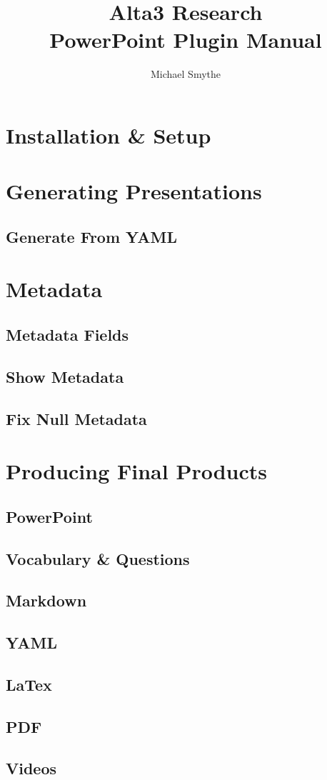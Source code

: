 \documentclass[12pt,a4paper,openany]{book}
\author{Michael Smythe}
\title{\textbf{Alta3 Research} \\ \small{PowerPoint Plugin Manual}}
\begin{document}
	\maketitle
	\chapter{Installation & Setup}
	\clearpage
	\chapter{Generating Presentations}
		\section{Generate From YAML}
	\clearpage
	\chapter{Metadata}
	\clearpage
		\section{Metadata Fields}
		\section{Show Metadata}
		\section{Fix Null Metadata}
	\chapter{Producing Final Products}
	\clearpage
	    \section{PowerPoint}
	    \section{Vocabulary \& Questions}
	    \section{Markdown}
	    \section{YAML}
		\section{LaTex}
		\section{PDF}
		\section{Videos}
\end{document}
